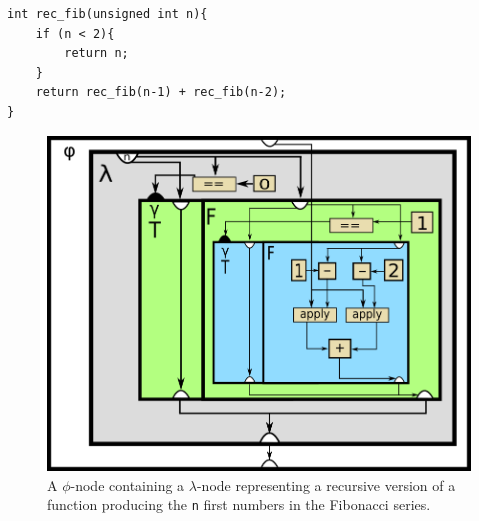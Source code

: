 \begin{lstlisting}[label={lst:rec_fib_phi}, style=customcpp,
caption={C/C++ code corresponding to the RVSDG subgraph in
Figure~\ref{fig:rec_fib_phi}, which represents a simple recursive fibonacci
function.}]
int rec_fib(unsigned int n){
	if (n < 2){
		return n;
	}
	return rec_fib(n-1) + rec_fib(n-2);
}
\end{lstlisting}
\vspace{-4\parskip} %

\begin{figure}[h!]
	\centering
	\includegraphics[width=\textwidth]{figures/recursive_fibonacci}
	\caption{A $\phi$-node containing a $\lambda$-node representing a recursive
version of a function producing the \lstinline!n! first numbers in the Fibonacci
series.}
	\label{fig:rec_fib_phi}
\end{figure}
